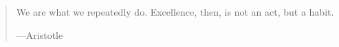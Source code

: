 \documentclass{beamer}
\newcommand{\bfr}[1]{\begin{frame}[fragile]\frametitle{{ #1 }}}
\begin{document}
\bfr{}

\LARGE 
\begin{quotation}
We are what we repeatedly do. Excellence, then, is not an act, but a habit.

\hfill ---Aristotle
\end{quotation}

\end{frame}
\end{document}
